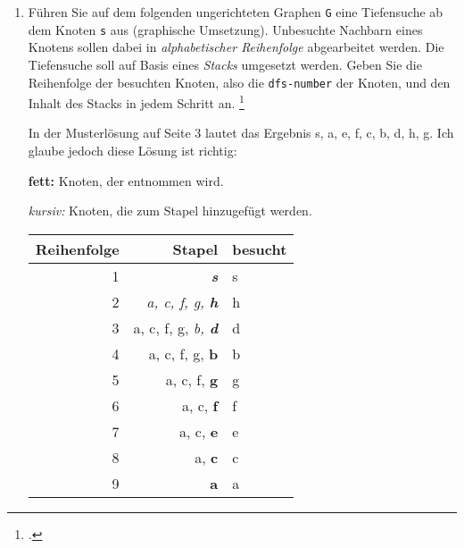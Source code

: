 \documentclass{bschlangaul-aufgabe}
\begin{document}
\begin{enumerate}


\item Führen Sie auf dem folgenden ungerichteten Graphen \texttt{G} eine
Tiefensuche ab dem Knoten \texttt{s} aus (graphische Umsetzung).
Unbesuchte Nachbarn eines Knotens sollen dabei in \emph{alphabetischer
Reihenfolge} abgearbeitet werden. Die Tiefensuche soll auf Basis eines
\emph{Stacks} umgesetzt werden. Geben Sie die
Reihenfolge der besuchten Knoten, also die \texttt{dfs-number} der
Knoten, und den Inhalt des Stacks in jedem Schritt an.
\footcite[Seite 2: Tiefensuche, Breitensuche, Aufgabe 3]{aud:ab:6}

\begin{center}
\end{center}

\begin{bAntwort}
In der Musterlösung auf Seite 3 lautet das Ergebnis s, a, e, f, c, b, d, h, g.
Ich glaube jedoch diese Lösung ist richtig:

\textbf{fett:} Knoten, der entnommen wird.

\textit{kursiv:} Knoten, die zum Stapel hinzugefügt werden.

\begin{tabular}{|r|r|l|}
\hline
\textbf{Reihenfolge} & \textbf{Stapel} & \textbf{besucht} \\\hline\hline
1 & \textit{\textbf{s}} & s \\\hline
2 & \textit{a, c, f, g, \textbf{h}} & h \\\hline
3 & a, c, f, g, \textit{b, \textbf{d}} & d \\\hline
4 & a, c, f, g, \textbf{b} & b \\\hline
5 & a, c, f, \textbf{g} & g \\\hline
6 & a, c, \textbf{f} & f \\\hline
7 & a, c, \textbf{e} & e \\\hline
8 & a, \textbf{c} & c \\\hline
9 & \textbf{a} & a \\\hline
\end{tabular}
\end{bAntwort}


\end{enumerate}
\end{document}
